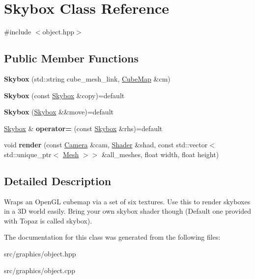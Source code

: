 \hypertarget{class_skybox}{}\section{Skybox Class Reference}
\label{class_skybox}


{\ttfamily \#include $<$object.\+hpp$>$}

\subsection*{Public Member Functions}
\begin{DoxyCompactItemize}
\item 
\mbox{\label{class_skybox_a9eaa05f0f0e1a913e7311ab458c6e81f}} 
{\bfseries Skybox} (std\+::string cube\+\_\+mesh\+\_\+link, \mbox{\hyperlink{class_cube_map}{Cube\+Map}} \&cm)
\item 
\mbox{\label{class_skybox_a448c687b2b7b3b11d44a85e4091bf0ec}} 
{\bfseries Skybox} (const \mbox{\hyperlink{class_skybox}{Skybox}} \&copy)=default
\item 
\mbox{\label{class_skybox_acddb130fc9b338af6b8300a8ecb03bf4}} 
{\bfseries Skybox} (\mbox{\hyperlink{class_skybox}{Skybox}} \&\&move)=default
\item 
\mbox{\label{class_skybox_aec0494b40f631666ed5253c782144d38}} 
\mbox{\hyperlink{class_skybox}{Skybox}} \& {\bfseries operator=} (const \mbox{\hyperlink{class_skybox}{Skybox}} \&rhs)=default
\item 
\mbox{\label{class_skybox_a2920565bf037f1c71a2bd261052b7ad5}} 
void {\bfseries render} (const \mbox{\hyperlink{class_camera}{Camera}} \&cam, \mbox{\hyperlink{class_shader}{Shader}} \&shad, const std\+::vector$<$ std\+::unique\+\_\+ptr$<$ \mbox{\hyperlink{class_mesh}{Mesh}} $>$$>$ \&all\+\_\+meshes, float width, float height)
\end{DoxyCompactItemize}


\subsection{Detailed Description}
Wraps an Open\+GL cubemap via a set of six textures. Use this to render skyboxes in a 3D world easily. Bring your own skybox shader though (Default one provided with Topaz is called \textquotesingle{}skybox\textquotesingle{}). 

The documentation for this class was generated from the following files\+:\begin{DoxyCompactItemize}
\item 
src/graphics/object.\+hpp\item 
src/graphics/object.\+cpp\end{DoxyCompactItemize}
